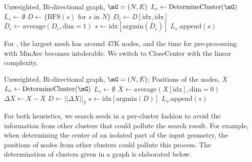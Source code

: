\begin{algorithm}[h]
    \begin{algorithmic}
        Unweighted, Bi-directional graph, $\mG=(N,E)$
        \STATE {}
        \STATE $L_c \leftarrow \text{DetermineCluster}(\mG) $
        \STATE $L_s \leftarrow \emptyset $
        \STATE {}
        \STATE {}
        \STATE $D \leftarrow \{ \text{BFS}(s) \text{ for } s \text{ in } N\} $
        \STATE $D_c \leftarrow D[\text{idx},\text{idx}]$
        \STATE $\bar{D}_c \leftarrow \text{average}(D_c,\text{dim}=1)$
        \STATE $s \leftarrow \text{idx}[\text{argmin}(\bar{D}_c)]$
        \STATE $L_s.\text{append}(s)$
        \ENDFOR
    \end{algorithmic}
    \caption{MinAve: seeding by minimum average geodesic distance to neighbors}
\end{algorithm}

For \fonts, the largest mesh has around 47K nodes, and the time for pre-processing with MinAve becomes intolerable. We switch to CloseCenter with the linear complexity.

\begin{algorithm}[h]
    \begin{algorithmic}
         Unweighted, Bi-directional graph, $\mG=(N,E)$; Positions of the nodes, $X$
        \STATE {}
        \STATE $L_c \leftarrow \text{DetermineCluster}(\mG) $
        \STATE $L_s \leftarrow \emptyset $
        \STATE $\bar{X} \leftarrow \text{average}(X[\text{idx}],\text{dim}=0)$
        \STATE $\Delta X \leftarrow X - \bar{X}$
        \STATE $D \leftarrow ||\Delta X||_2$
        \STATE $s \leftarrow \text{idx}[\text{argmin}(D)]$
        \STATE $L_s.\text{append}(s)$
        \ENDFOR
    \end{algorithmic}
    \caption{CloseCenter: seeding by minimum distance to the center of cluster}
\end{algorithm}

For both heuristics, we search seeds in a per-cluster fashion to avoid the information from other clusters that could pollute the search result. For example, when determining the center of an isolated part of the input geometry, the positions of nodes from other clusters could pollute this process. The determination of clusters given in a graph is elaborated below.

